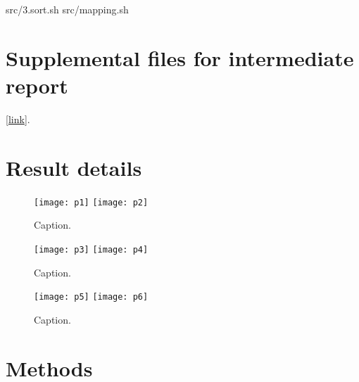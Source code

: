src/3.sort.sh\markdownRendererOlItemEnd 
{}src/mapping.sh\markdownRendererOlItemEnd 
\markdownRendererOlEndTight \markdownRendererInterblockSeparator
{}\section{Supplemental files for intermediate report} [\href{https://github.com/DylanLawless/kit_assess/data/processed/}{link}].\markdownRendererInterblockSeparator
{}\section{Result details}\markdownRendererInterblockSeparator
{}\begin{figure}[ht] \hspace*{0cm} \begin{center} \texttt{[image: p1]} \texttt{[image: p2]} \caption{Caption.} \label{fig:p1p2} \end{center} \end{figure}\markdownRendererInterblockSeparator
{}\begin{figure}[ht] \hspace*{0cm} \begin{center} \texttt{[image: p3]} \texttt{[image: p4]} \caption{Caption.} \label{fig:p3p4} \end{center} \end{figure}\markdownRendererInterblockSeparator
{}\begin{figure}[ht] \hspace*{0cm} \begin{center} \texttt{[image: p5]} \texttt{[image: p6]} \caption{Caption.} \label{fig:p5p6} \end{center} \end{figure}\markdownRendererInterblockSeparator
{}\section{Methods}\relax